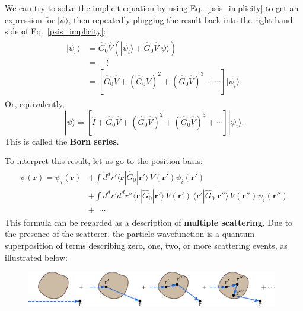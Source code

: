 \documentclass[pra,12pt]{revtex4}
\begin{document}
We can try to solve the implicit equation by using
Eq.~\eqref{psis_implicity} to get an expression for $|\psi\rangle$,
then repeatedly plugging the result back into the right-hand side of
Eq.~\eqref{psis_implicity}:
\begin{align}
  \begin{aligned}|\psi_s\rangle &= \hat{G}_0 \hat{V} \left(|\psi_i\rangle + \hat{G}_0 \hat{V}|\psi\rangle\right) \\ &= \quad \vdots \\ &= \left[\hat{G}_0 \hat{V} + (\hat{G}_0 \hat{V})^2 + (\hat{G}_0 \hat{V})^3 + \cdots\right]|\psi_i\rangle.\end{aligned}
\end{align}
Or, equivalently,
\begin{equation}
  |\psi\rangle = \left[\hat{I} + \hat{G}_0 \hat{V} + (\hat{G}_0 \hat{V})^2 + (\hat{G}_0 \hat{V})^3 + \cdots\right]|\psi_i\rangle.
  \label{bornseries}
\end{equation}
This is called the \textbf{Born series}.

To interpret this result, let us go to the position basis:
\begin{align}
  \begin{aligned}\psi(\mathbf{r}) = \psi_i(\mathbf{r}) &+ \int d^dr' \langle \mathbf{r} | \hat{G}_0 |\mathbf{r}'\rangle\, V(\mathbf{r}') \psi_i(\mathbf{r}') \\ &+ \int d^dr' d^dr'' \langle \mathbf{r} | \hat{G}_0 |\mathbf{r}'\rangle\, V(\mathbf{r}') \, \langle \mathbf{r}' | \hat{G}_0 |\mathbf{r}''\rangle \, V(\mathbf{r}'') \psi_i(\mathbf{r}'') \\ &+ \;\;\cdots\end{aligned}
    \label{Bornposition}
\end{align}
This formula can be regarded as a description of \textbf{multiple
  scattering}.  Due to the presence of the scatterer, the particle
wavefunction is a quantum superposition of terms describing zero, one,
two, or more scattering events, as illustrated below:

\begin{figure}[h!]
  \centering\includegraphics[width=0.98\textwidth]{bornseries}
\end{figure}
\end{document}

